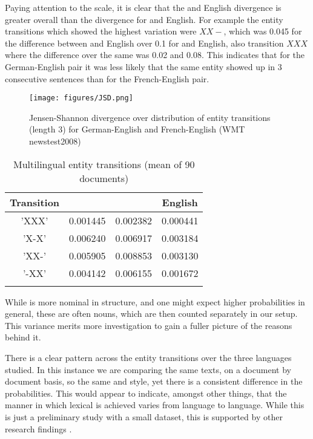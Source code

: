 \documentclass[output=paper]{langsci/langscibook.cls}
\begin{document}
Paying attention to the scale, it is clear that the  and English divergence is greater overall than the divergence for  and English. For example the entity transitions which showed the highest variation were $XX-$, which was 0.045 for the difference between  and English over 0.1 for  and English, also transition $XXX$ where the difference over the same was 0.02 and 0.08. This indicates that for the German-English pair it was less likely that the same entity showed up in 3 consecutive sentences than for the French-English pair.
	
\begin{figure}
\texttt{[image: figures/JSD.png]}
	\caption{Jensen-Shannon divergence over distribution of entity transitions (length 3) for German-English and French-English (WMT newstest2008)}\label{fig:FrEnDeJSD}
\end{figure}

\begin{table}
	 
	
		\begin{tabular}{cccc}
			\lsptoprule
			\bf Transition & \bf \isi{German} & \bf \isi{French} & \bf English  \\  
			\midrule
			'XXX' & 0.001445 &	0.002382 & 0.000441 \\
			'X-X' &  0.006240 & 0.006917 & 0.003184 \\
			'XX-' & 0.005905 &  0.008853 & 0.003130 \\
			'-XX' & 0.004142 & 0.006155 & 0.001672 \\
			\lspbottomrule
		\end{tabular}
	
	\caption{\label{table:multi}Multilingual entity transitions (mean of 90 documents) }
\end{table}

While  is more nominal in structure, and one might expect higher  probabilities in general, these are often  nouns, which are then counted separately in our setup. This variance merits more investigation to gain a fuller picture of the reasons behind it.

There is a clear pattern across the entity transitions over the three languages studied. 
In this instance we are comparing the same texts, on a document by document basis, so the same  and style, yet there is a consistent difference in the probabilities. This would appear to indicate, amongst other things, that the manner in which lexical  is achieved varies from language to language. While this is just a preliminary study with a small dataset, this is supported by other research findings \citep{lapshinova2015variation}.
\end{document}
